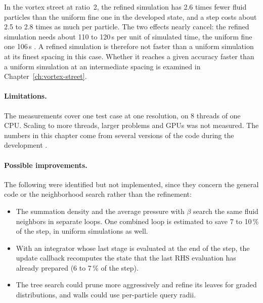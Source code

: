 In the vortex street at ratio~2, the refined simulation has 2.6 times fewer fluid particles
than the uniform fine one in the developed state, and a step costs about 2.5 to 2.8 times as
much per particle. The two effects nearly cancel: the refined simulation needs about
110 to 120\,s per unit of simulated time, the uniform fine one 106\,s . A
refined simulation is therefore not faster than a uniform simulation at its finest spacing
in this case. Whether it reaches a given accuracy faster than a uniform simulation at an
intermediate spacing is examined in Chapter~\ref{ch:vortex-street}.

\paragraph{Limitations.}
The measurements cover one test case at one resolution, on 8 threads of one CPU. Scaling to
more threads, larger problems and GPUs was not measured. The numbers in this chapter come
from several versions of the code during the development .

\paragraph{Possible improvements.}
The following were identified but not implemented, since they concern the general code or
the neighborhood search rather than the refinement:
\begin{itemize}
  \item The summation density and the average pressure with $\beta$ search the same fluid
        neighbors in separate loops. One combined loop is estimated to save 7 to 10\,\% of
        the step, in uniform simulations as well.
  \item With an integrator whose last stage is evaluated at the end of the step, the update
        callback recomputes the state that the last RHS evaluation has already prepared
        (6 to 7\,\% of the step).
  \item The tree search could prune more aggressively and refine its leaves for graded
        distributions, and walls could use per-particle query radii.
\end{itemize}
